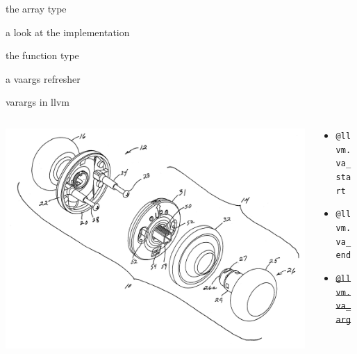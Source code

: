 \documentclass{beamer}
\begin{document}
\begin{frame}{the array type}
  
\end{frame}

\begin{frame}{a look at the implementation}
  
\end{frame}

\begin{frame}{the function type}
  
\end{frame}

\begin{frame}{a vaargs refresher}
  
\end{frame}

\begin{frame}{varargs in llvm}
  \begin{columns}
    \begin{column}[b]{5.5cm}
      \includegraphics[scale=0.05]{variable-knob}
    \end{column}
    \begin{column}[b]{4.5cm}
      \begin{itemize}
      \item[] \texttt{@llvm.va\_start}
      \item[] \texttt{@llvm.va\_end}
      \item[] \texttt{\sout{@llvm.va\_arg}}
      \end{itemize}
    \end{column}
  \end{columns}
\end{frame}
\end{document}
